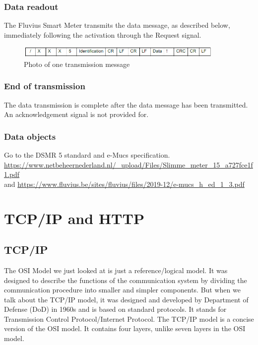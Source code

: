 \documentclass[a4paper,twoside, 12pt]{report}
\theoremstyle{break}
\begin{document}
\subsubsection{Data readout}
The Fluvius Smart Meter transmits the data message, as described below, immediately following the activation through the Request signal.

\begin{figure}[!ht]
  \centering
  \includegraphics[width=10cm]{CommunicationExample.png}
  \qquad
  \caption{Photo of one transmission message}
\end{figure}

\subsubsection{End of transmission}
The data transmission is complete after the data message has been transmitted. An acknowledgement signal is not provided for.

\subsubsection{Data objects}

Go to the DSMR 5 standard and e-Mucs specification.
\url{https://www.netbeheernederland.nl/_upload/Files/Slimme_meter_15_a727fce1f1.pdf}\\
and \url{https://www.fluvius.be/sites/fluvius/files/2019-12/e-mucs_h_ed_1_3.pdf}
\vfill
\eject

\section{TCP/IP and HTTP}
\subsection{TCP/IP}

The OSI Model we just looked at is just a reference/logical model. It was designed to describe the functions of the communication system by dividing the communication procedure into smaller and simpler components. But when we talk about the TCP/IP model, it was designed and developed by Department of Defense (DoD) in 1960s and is based on standard protocols. It stands for Transmission Control Protocol/Internet Protocol. The TCP/IP model is a concise version of the OSI model. It contains four layers, unlike seven layers in the OSI model.
\end{document}
